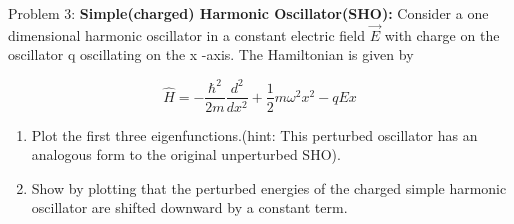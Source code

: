 \documentclass[11pt]{article}
\begin{document}
\newpage
	Problem 3: \textbf{Simple(charged) Harmonic Oscillator(SHO):} Consider a one dimensional harmonic oscillator in a constant electric field $\vec{E}$ with charge on the oscillator q oscillating on the x -axis. The Hamiltonian is given by
	
	\begin{equation*}
		\hat{H} = -\frac{\hbar^2}{2m} \frac{d^2}{dx^2} + \frac12 m\omega^2x^2 -qEx
	\end{equation*}

\begin{enumerate}
	\item Plot the first three eigenfunctions.(hint: This perturbed oscillator has an analogous form to the original unperturbed SHO).
	
	\item Show by plotting that the perturbed energies of the charged simple harmonic oscillator are shifted downward by a constant term. 
\end{enumerate}
\end{document}
